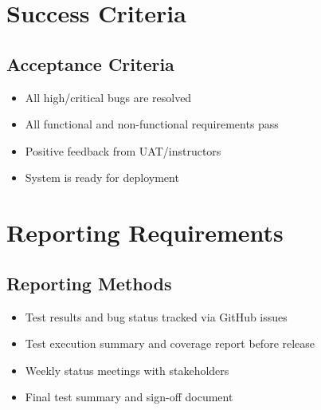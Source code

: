 \documentclass[a4paper,11pt]{scrartcl}
\begin{document}
\section{Success Criteria}

\subsection{Acceptance Criteria}
\begin{itemize}[leftmargin=*]
    \item All high/critical bugs are resolved
    \item All functional and non-functional requirements pass
    \item Positive feedback from UAT/instructors
    \item System is ready for deployment
\end{itemize}

\section{Reporting Requirements}

\subsection{Reporting Methods}
\begin{itemize}[leftmargin=*]
    \item Test results and bug status tracked via GitHub issues
    \item Test execution summary and coverage report before release
    \item Weekly status meetings with stakeholders
    \item Final test summary and sign-off document
\end{itemize}
\end{document}

